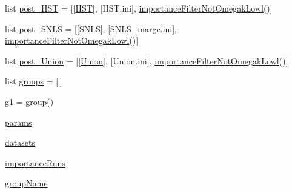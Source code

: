 \begin{DoxyCompactItemize}
\item 
list \mbox{\hyperlink{namespaceplanck_1_1settings__planck__nominal_aa5bad6a0c5c75f4926b9fcd5f29e5f35}{post\+\_\+\+H\+ST}} = \mbox{[}\mbox{[}\mbox{\hyperlink{namespaceplanck_1_1settings__planck__nominal_a0a9ee49b7e265201d4d045005f10c8ff}{H\+ST}}\mbox{]}, \mbox{[}\textquotesingle{}H\+S\+T.\+ini\textquotesingle{}\mbox{]}, \mbox{\hyperlink{classplanck_1_1settings__planck__nominal_1_1importanceFilterNotOmegakLowl}{importance\+Filter\+Not\+Omegak\+Lowl}}()\mbox{]}
\item 
list \mbox{\hyperlink{namespaceplanck_1_1settings__planck__nominal_a133cf7f02866829b24a626f8e6627b5b}{post\+\_\+\+S\+N\+LS}} = \mbox{[}\mbox{[}\mbox{\hyperlink{namespaceplanck_1_1settings__planck__nominal_a3f2634d940ded428a6f31ee88bc9f86b}{S\+N\+LS}}\mbox{]}, \mbox{[}\textquotesingle{}S\+N\+L\+S\+\_\+marge.\+ini\textquotesingle{}\mbox{]}, \mbox{\hyperlink{classplanck_1_1settings__planck__nominal_1_1importanceFilterNotOmegakLowl}{importance\+Filter\+Not\+Omegak\+Lowl}}()\mbox{]}
\item 
list \mbox{\hyperlink{namespaceplanck_1_1settings__planck__nominal_a527dd45eb0797fec02fb9506c8911bfe}{post\+\_\+\+Union}} = \mbox{[}\mbox{[}\mbox{\hyperlink{namespaceplanck_1_1settings__planck__nominal_a881d9a8c1c79af83da31227898c4cba7}{Union}}\mbox{]}, \mbox{[}\textquotesingle{}Union.\+ini\textquotesingle{}\mbox{]}, \mbox{\hyperlink{classplanck_1_1settings__planck__nominal_1_1importanceFilterNotOmegakLowl}{importance\+Filter\+Not\+Omegak\+Lowl}}()\mbox{]}
\item 
list \mbox{\hyperlink{namespaceplanck_1_1settings__planck__nominal_aae10734d74eaf536c80213af29047355}{groups}} = \mbox{[}$\,$\mbox{]}
\item 
\mbox{\hyperlink{namespaceplanck_1_1settings__planck__nominal_ab30bc218bbf10fed270997afa741e76b}{g1}} = \mbox{\hyperlink{classplanck_1_1settings__planck__nominal_1_1group}{group}}()
\item 
\mbox{\hyperlink{namespaceplanck_1_1settings__planck__nominal_a03f8d29b82a6f52b2b0864272d1c6c15}{params}}
\item 
\mbox{\hyperlink{namespaceplanck_1_1settings__planck__nominal_a3be29d7beb87a2823837bdf3bd5a1ac2}{datasets}}
\item 
\mbox{\hyperlink{namespaceplanck_1_1settings__planck__nominal_ac2cdc8d687aab37b8480922c95197fc6}{importance\+Runs}}
\item 
\mbox{\hyperlink{namespaceplanck_1_1settings__planck__nominal_aaa52e8c95179cd86d48ad989bf7665fa}{group\+Name}}
\item 

\end{DoxyCompactItemize}
